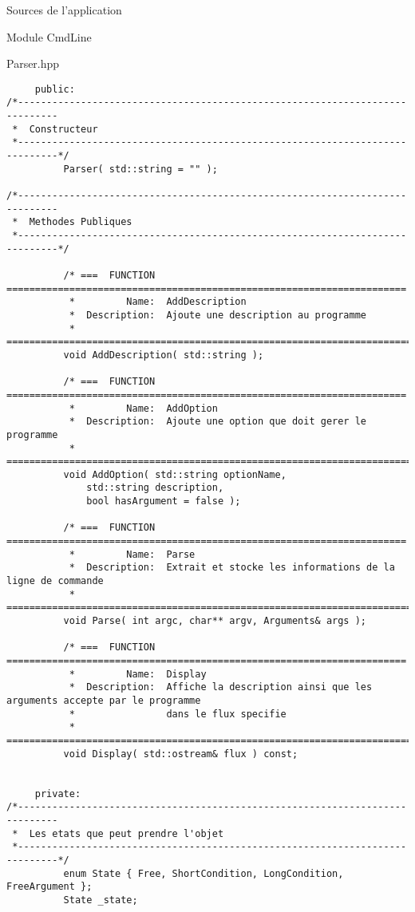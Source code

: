 \documentclass{article}
\begin{document}
\begin{section}{Sources de l'application}
\begin{subsection}{Module CmdLine}
\begin{paragraph}{Parser.hpp}
\begin{verbatim}
     public:
/*-----------------------------------------------------------------------------
 *  Constructeur
 *-----------------------------------------------------------------------------*/
          Parser( std::string = "" );

/*-----------------------------------------------------------------------------
 *  Methodes Publiques
 *-----------------------------------------------------------------------------*/

          /* ===  FUNCTION  ======================================================================
           *         Name:  AddDescription
           *  Description:  Ajoute une description au programme
           * =====================================================================================*/
          void AddDescription( std::string );

          /* ===  FUNCTION  ======================================================================
           *         Name:  AddOption
           *  Description:  Ajoute une option que doit gerer le programme
           * =====================================================================================*/
          void AddOption( std::string optionName, 
			  std::string description, 
			  bool hasArgument = false );
          
          /* ===  FUNCTION  ======================================================================
           *         Name:  Parse
           *  Description:  Extrait et stocke les informations de la ligne de commande
           * =====================================================================================*/
          void Parse( int argc, char** argv, Arguments& args );

          /* ===  FUNCTION  ======================================================================
           *         Name:  Display
           *  Description:  Affiche la description ainsi que les arguments accepte par le programme
           *                dans le flux specifie
           * =====================================================================================*/
          void Display( std::ostream& flux ) const;


     private:
/*-----------------------------------------------------------------------------
 *  Les etats que peut prendre l'objet
 *-----------------------------------------------------------------------------*/
          enum State { Free, ShortCondition, LongCondition, FreeArgument };
          State _state;


\end{verbatim}
\end{paragraph}
\end{subsection}
\end{section}
\end{document}
